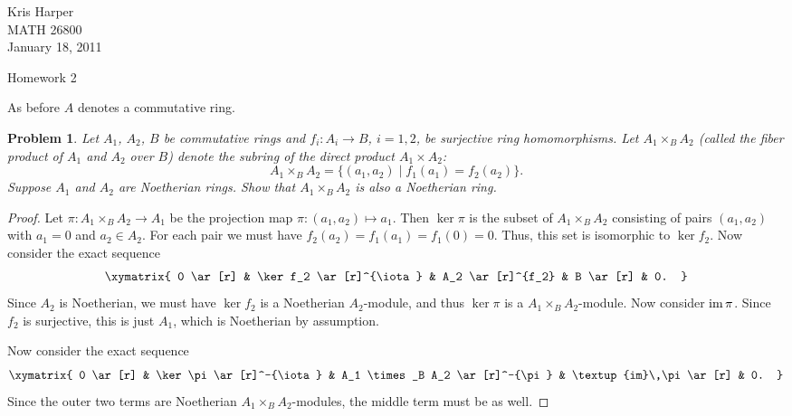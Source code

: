 \documentclass{article}
\newcommand{\im}{\textup{im}\,}
\newtheorem{problem}{Problem}
\begin{document}
\begin{flushright}
Kris Harper\\

MATH 26800\\

January 18, 2011
\end{flushright}

\begin{center}
Homework 2
\end{center}

\noindent
As before $A$ denotes a commutative ring.

\begin{problem}
Let $A_1$, $A_2$, $B$ be commutative rings and $f_i : A_i \to B$, $i = 1, 2$, be surjective ring homomorphisms. Let $A_1 \times_B A_2$ (called the fiber product of $A_1$ and $A_2$ over $B$) denote the subring of the direct product $A_1 \times A_2$:
\[
A_1 \times_B A_2 = \{(a_1, a_2) \mid f_1(a_1) = f_2(a_2)\}.
\]
Suppose $A_1$ and $A_2$ are Noetherian rings. Show that $A_1 \times_B A_2$ is also a Noetherian ring.
\end{problem}
\begin{proof}
Let $\pi : A_1 \times_B A_2 \to A_1$ be the projection map $\pi : (a_1, a_2) \mapsto a_1$. Then $\ker \pi$ is the subset of $A_1 \times_B A_2$ consisting of pairs $(a_1,a_2)$ with $a_1 = 0$ and $a_2 \in A_2$. For each pair we must have $f_2(a_2) = f_1(a_1) = f_1(0) = 0$. Thus, this set is isomorphic to $\ker f_2$. Now consider the exact sequence
\[
\xymatrix{
0 \ar[r] & \ker f_2 \ar[r]^{\iota} & A_2 \ar[r]^{f_2} & B \ar[r] & 0.
}
\]
Since $A_2$ is Noetherian, we must have $\ker f_2$ is a Noetherian $A_2$-module, and thus $\ker \pi$ is a $A_1 \times_B A_2$-module. Now consider $\im \pi$. Since $f_2$ is surjective, this is just $A_1$, which is Noetherian by assumption.

Now consider the exact sequence
\[
\xymatrix{
0 \ar[r] & \ker \pi \ar[r]^-{\iota} & A_1 \times_B A_2 \ar[r]^-{\pi} & \im \pi \ar[r] & 0.
}
\]
Since the outer two terms are Noetherian $A_1 \times_B A_2$-modules, the middle term must be as well.
\end{proof}
\end{document}
